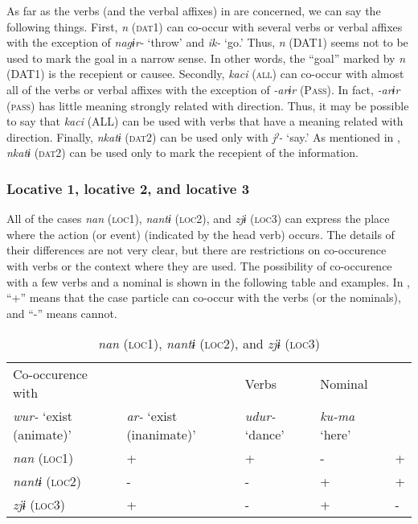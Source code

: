 As far as the verbs (and the verbal affixes) in  are concerned, we can say the following things. First, \textit{n} (\textsc{dat}1) can co-occur with several verbs or verbal affixes with the exception of \textit{nagɨr-} ‘throw’ and \textit{ik-} ‘go.’ Thus, \textit{n} (DAT1) seems not to be used to mark the goal in a narrow sense. In other words, the “goal” marked by \textit{n} (DAT1) is the recepient or causee. Secondly, \textit{kaci} (\textsc{all}) can co-occur with almost all of the verbs or verbal affixes with the exception of \textit{-arɨr} (P\textsc{ass}). In fact, \textit{-arɨr} (\textsc{pass}) has little meaning strongly related with direction. Thus, it may be possible to say that \textit{kaci} (ALL) can be used with verbs that have a meaning related with direction. Finally, \textit{nkatɨ} (\textsc{dat2}) can be used only with \textit{jˀ-} ‘say.’ As mentioned in , \textit{nkatɨ} (\textsc{dat2}) can be used only to mark the recepient of the information.

\subsubsection{Locative 1, locative 2, and locative 3}

All of the cases \textit{nan} (\textsc{loc1}), \textit{nantɨ} (\textsc{loc2}), and \textit{zjɨ} (\textsc{loc3}) can express the place where the action (or event) (indicated by the head verb) occurs. The details of their differences are not very clear, but there are restrictions on co-occurence with verbs or the context where they are used. The possibility of co-occurence with a few verbs and a nominal is shown in the following table and examples. In , “+” means that the case particle can co-occur with the verbs (or the nominals), and “-” means cannot.

\begin{table}
\caption{\label{tab:key:43} \textit{nan} (\textsc{loc1}),
                            \textit{nantɨ} (\textsc{loc2}), and
                            \textit{zjɨ} (\textsc{loc3})
                            }

\begin{tabular}{lllll}
Co-occurence with  && Verbs &        Nominal\\
\textit{wur-} ‘exist (animate)’  &\textit{ar-} ‘exist (inanimate)’ & \textit{udur-} ‘dance’    &\textit{ku-ma} ‘here’\\
\textit{nan}  (\textsc{loc1})    &+ & + &  -  &  + \\
\textit{nantɨ}  (\textsc{loc2})  &- & - &  +  &  + \\
\textit{zjɨ}  (\textsc{loc3})    &+ & - &  +  &  - \\
\end{tabular}
\end{table}

